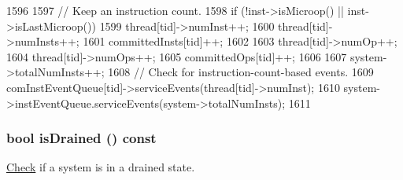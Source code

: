 \begin{DoxyCode}
1596 {
1597     // Keep an instruction count.
1598     if (!inst->isMicroop() || inst->isLastMicroop()) {
1599         thread[tid]->numInst++;
1600         thread[tid]->numInsts++;
1601         committedInsts[tid]++;
1602     }
1603     thread[tid]->numOp++;
1604     thread[tid]->numOps++;
1605     committedOps[tid]++;
1606 
1607     system->totalNumInsts++;
1608     // Check for instruction-count-based events.
1609     comInstEventQueue[tid]->serviceEvents(thread[tid]->numInst);
1610     system->instEventQueue.serviceEvents(system->totalNumInsts);
1611 }
\end{DoxyCode}
\hypertarget{classFullO3CPU_adf5473c18a3d7c1e88c4a2072bce5526}{
\subsubsection[{isDrained}]{\setlength{\rightskip}{0pt plus 5cm}bool isDrained () const}}
\label{classFullO3CPU_adf5473c18a3d7c1e88c4a2072bce5526}
\hyperlink{classCheck}{Check} if a system is in a drained state. 


